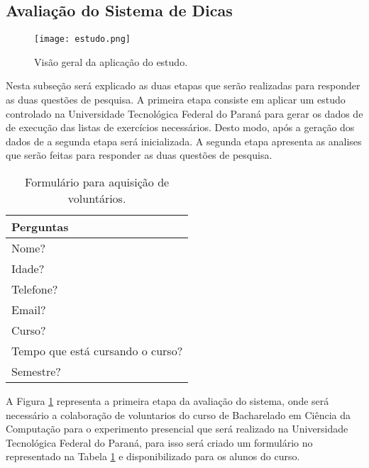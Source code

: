\subsection{Avaliação do Sistema de Dicas}

\begin{figure}[ht]
	\captionsetup{justification=centering}
	\texttt{[image: estudo.png]}
	\caption{Visão geral da aplicação do estudo.}
	\label{figura:estudo}
\end{figure}

Nesta subseção será explicado as duas etapas que serão realizadas para responder as duas questões de pesquisa. A primeira etapa consiste em aplicar um estudo controlado na Universidade Tecnológica Federal do Paraná para gerar os dados de  de execução das listas de exercícios necessários. Desto modo, após a geração dos dados de  a segunda etapa será inicializada. A segunda etapa apresenta as analises que serão feitas para responder as duas questões de pesquisa.

\begin{table}[]
	\centering
	\captionsetup{justification=centering}
	\caption{Formulário para aquisição de voluntários.}
	\label{tabela:formulário}
	\begin{tabular}{l}
		\hline
		Perguntas                        \\ \hline
		Nome?                            \\
		Idade?                           \\
		Telefone?                        \\
		Email?                           \\
		Curso?                           \\
		Tempo que está cursando o curso? \\
		Semestre?                        \\ \hline
	\end{tabular}
\end{table}

A Figura \ref{figura:estudo} representa a primeira etapa da avaliação do sistema, onde será necessário a colaboração de voluntarios do curso de Bacharelado em Ciência da Computação para o experimento presencial que será realizado na Universidade Tecnológica Federal do Paraná, para isso será criado um formulário no  representado na Tabela \ref{tabela:formulário} e disponibilizado  para os alunos do curso.

